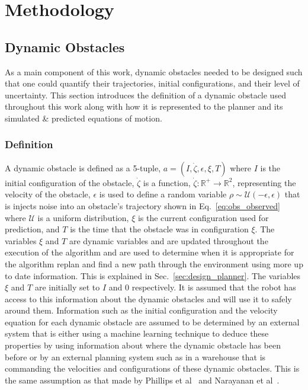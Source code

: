 


\chapter{Methodology}

\label{chapter:methodology}

\section{Dynamic Obstacles}

As a main component of this work, dynamic obstacles needed to be designed such
that one could quantify their trajectories, initial configurations, and their
level of uncertainty. This section introduces the definition of a dynamic
obstacle used throughout this work along with how it is represented to the
planner and its simulated \& predicted equations of motion.

\subsection{Definition}

A dynamic obstacle is defined as a 5-tuple, $a = (I, \dot{\zeta},
\epsilon, \xi, T)$ where $I$ is the initial configuration of the obstacle,
$\dot{\zeta}$ is a function, $\dot{\zeta}: \mathbb{R}^+ \rightarrow
\mathbb{R}^2$, representing the velocity of the obstacle, $\epsilon$ is used to
define a random variable $\rho \sim \mathcal{U}(-\epsilon, \epsilon)$ that is
injects noise into an obstacle's trajectory shown in Eq.~\ref{eq:obs_observed}
where $\mathcal{U}$ is a uniform distribution, $\xi$ is the current
configuration used for prediction, and $T$ is the time that the obstacle was in
configuration $\xi$.  The variables $\xi$ and $T$ are dynamic variables and are
updated throughout the execution of the algorithm and are used to determine
when it is appropriate for the algorithm replan and find a new path through the
environment using more up to date information. This is explained in
Sec.~\ref{sec:design_planner}. The variables $\xi$ and $T$ are initially set to
$I$ and $0$ respectively. It is assumed that the robot has access to this
information about the dynamic obstacles and will use it to safely around them.
Information such as the initial configuration and the velocity equation for
each dynamic obstacle are assumed to be determined by an external system that
is either using a machine learning technique to deduce these properties by
using information about where the dynamic obstacle has been before or by an
external planning system such as in a warehouse that is commanding the
velocities and configurations of these dynamic obstacles. This is the same
assumption as that made by Phillips et al~\cite{sipp} and Narayanan et
al~\cite{asipp}.

